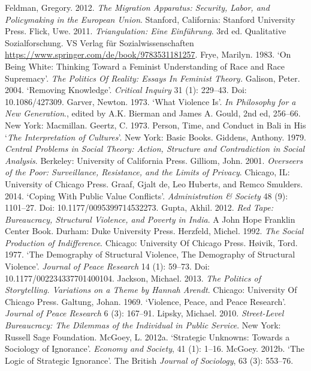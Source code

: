 \begin{thebibliography}{99}
 Feldman, Gregory. 2012. \textit{The Migration Apparatus: Security, Labor, and Policymaking in the European Union}. Stanford, California: Stanford University Press.
 Flick, Uwe. 2011. \textit{Triangulation: Eine Einführung}. 3rd ed. Qualitative Sozialforschung. VS Verlag für Sozialwissenschaften \url{https://www.springer.com/de/book/9783531181257}.
 Frye, Marilyn. 1983. ‘On Being White: Thinking Toward a Feminist Understanding of Race and Race Supremacy’. \textit{The Politics Of Reality: Essays In Feminist Theory.}
 Galison, Peter. 2004. ‘Removing Knowledge’. \textit{Critical Inquiry} 31 (1): 229–43. Doi: 10.1086/427309.
 Garver, Newton. 1973. ‘What Violence Is’. \textit{In Philosophy for a New Generation}., edited by A.K. Bierman and James A. Gould, 2nd ed, 256–66. New York: Macmillan.
 Geertz, C. 1973. Person, Time, and Conduct in Bali in His ‘\textit{The Interpretation of Cultures}’. New York: Basic Books.
 Giddens, Anthony. 1979. \textit{Central Problems in Social Theory: Action, Structure and Contradiction in Social Analysis}. Berkeley: University of California Press.
 Gilliom, John. 2001. \textit{Overseers of the Poor: Surveillance, Resistance, and the Limits of Privacy}. Chicago, IL: University of Chicago Press.
 Graaf, Gjalt de, Leo Huberts, and Remco Smulders. 2014. ‘Coping With Public Value Conflicts’. \textit{Administration \& Society }48 (9): 1101–27. Doi: 10.1177/0095399714532273.
 Gupta, Akhil. 2012. \textit{Red Tape: Bureaucracy, Structural Violence, and Poverty in India}. A John Hope Franklin Center Book. Durham: Duke University Press.
 Herzfeld, Michel. 1992. \textit{The Social Production of Indifference}. Chicago: University Of Chicago Press.
 Høivik, Tord. 1977. ‘The Demography of Structural Violence, The Demography of Structural Violence’. \textit{Journal of Peace Research }14 (1): 59–73. Doi: 10.1177/002234337701400104.
 Jackson, Michael. 2013. \textit{The Politics of Storytelling. Variations on a Theme by Hannah Arendt}. Chicago: University Of Chicago Press.
 Galtung, Johan. 1969. ‘Violence, Peace, and Peace Research’. \textit{Journal of Peace Research} 6 (3): 167–91.
 Lipsky, Michael. 2010. \textit{Street-Level Bureaucracy: The Dilemmas of the Individual in Public Service}. New York: Russell Sage Foundation.
 McGoey, L. 2012a. ‘Strategic Unknowns: Towards a Sociology of Ignorance’. \textit{Economy and Society}, 41 (1): 1–16.
 McGoey. 2012b. ‘The Logic of Strategic Ignorance’. The British \textit{Journal of Sociology}, 63 (3): 553–76.

\end{thebibliography}
